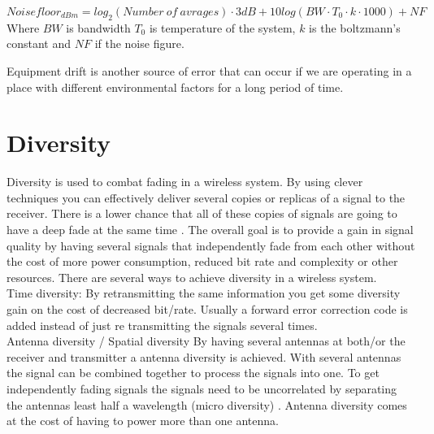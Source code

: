\begin{equation}
Noisefloor_{dBm} = log_{2}(Number \ of \ avrages)\cdot 3dB +10log(BW\cdot T_{0}\cdot k\cdot 1000) + NF
\label{NFwithAVG}
\end{equation}
Where $BW$ is bandwidth $T_0$ is temperature of the system, $k$ is the boltzmann's constant and $NF$ if the noise figure.
 

Equipment drift is another source of error that can occur if we are operating in a place with different environmental factors for a long period of time.

\section{Diversity}
Diversity is used to combat fading in a wireless system. By using clever techniques you can effectively deliver several copies or replicas of a signal to the receiver. There is a lower chance that all of these copies of signals are going to have a deep fade at the same time \citep[p. 4-6]{diversityFuture}. The overall goal is to provide a gain in signal quality by having several signals that independently fade from each other without the cost of more power consumption, reduced bit rate and complexity or other resources. There are several ways to achieve diversity in a wireless system. \\
Time diversity: By retransmitting the same information you get some diversity gain on the cost of decreased bit/rate. Usually a forward error correction code is added instead of just re transmitting the signals several times. \\
Antenna diversity / Spatial diversity
By having several antennas at both/or the receiver and transmitter a antenna diversity is achieved. With several antennas the signal can be combined together to process the signals into one. To get independently fading signals the signals need to be uncorrelated by separating the antennas least half a wavelength (micro diversity) \citep{diversityAntenna}. Antenna diversity comes at the cost of having to power more than one antenna.



